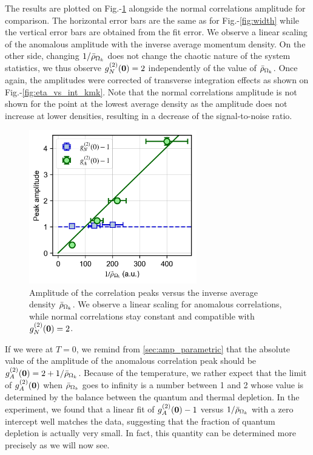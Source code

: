 The results are plotted on Fig.-\ref{fig:amplitude_vs_rhob} alongside the normal correlations amplitude for comparison. The horizontal error bars are the same as for Fig.-\ref{fig:width} while the vertical error bars are obtained from the fit error. We observe a linear scaling of the anomalous amplitude with the inverse average momentum density. On the other side, changing $1/\bar{\rho}_{\Omega_k}$ does not change the chaotic nature of the system statistics, we thus observe $g^{(2)}_N (\bm{0})=2$ independently of the value of $\rhob$. Once again, the amplitudes were corrected of transverse integration effects as shown on Fig.-\ref{fig:eta_vs_int_kmk}. Note that the normal correlations amplitude is not shown for the point at the lowest average density as the amplitude does not increase at lower densities, resulting in a decrease of the signal-to-noise ratio.

\begin{figure}
    \centering
    \includegraphics[width=0.65\textwidth]{Fig/Chapter4/amplitude_kmk.png}
    \caption[Amplitude of the correlation peaks versus the inverse average density $\rhob$]{Amplitude of the correlation peaks versus the inverse average density $\rhob$. We observe a linear scaling for anomalous correlations, while normal correlations stay constant and compatible with $g^{(2)}_N (\bm{0})=2$.}
    \label{fig:amplitude_vs_rhob}
\end{figure}

If we were at $T=0$, we remind from \ref{sec:amp_parametric} that the absolute value of the amplitude of the anomalous correlation peak should be $g^{(2)}_A (\bm{0}) = 2 + 1/\bar{\rho}_{\Omega_k}$. Because of the temperature, we rather expect that the limit of $g^{(2)}_A (\bm{0})$ when $\rhob$ goes to infinity is a number between 1 and 2 whose value is determined by the balance between the quantum and thermal depletion. In the experiment, we found that a linear fit of $g^{(2)}_A (\bm{0})-1$ versus $1/\bar{\rho}_{\Omega_k}$ with a zero intercept well matches the data, suggesting that the fraction of quantum depletion is actually very small. In fact, this quantity can be determined more precisely as we will now see.


